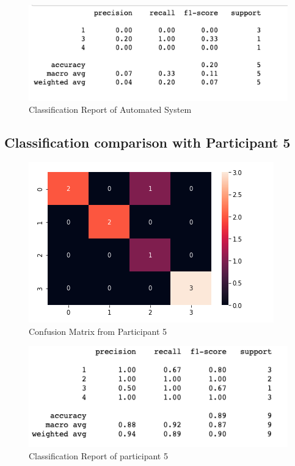 \begin{figure}[!htp]
    \includegraphics[width=\textwidth]{Images/a4r.png}
    \caption{Classification Report of Automated System}
    \label{fig:f11}
\end{figure}

\pagebreak
\subsection*{Classification comparison with Participant 5}

\begin{figure}[!htp]
    \includegraphics[width=\textwidth]{Images/p5.png}
    \caption{Confusion Matrix from Participant 5}
    \label{fig:f11}
\end{figure}

\begin{figure}[!htp]
    \includegraphics[width=\textwidth]{Images/p5r.png}
    \caption{Classification Report of participant 5}
    \label{fig:f11}
\end{figure}

